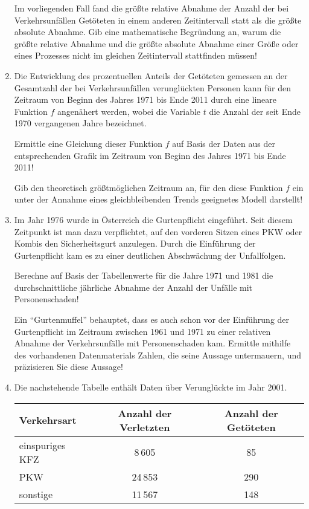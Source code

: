 \begin{langesbeispiel}
\begin{enumerate}
	Im vorliegenden Fall fand die größte relative Abnahme der Anzahl der bei Verkehrsunfällen Getöteten in einem anderen Zeitintervall statt als die größte absolute Abnahme. Gib eine mathematische Begründung an, warum die größte relative Abnahme und die größte absolute Abnahme einer Größe oder eines Prozesses nicht im gleichen Zeitintervall stattfinden müssen!

\item Die Entwicklung des prozentuellen Anteils der Getöteten gemessen an der Gesamtzahl der bei Verkehrsunfällen verunglückten Personen kann für den Zeitraum von Beginn des Jahres 1971 bis Ende 2011 durch eine lineare Funktion $f$ angenähert werden, wobei die Variable $t$ die Anzahl der seit Ende 1970 vergangenen Jahre bezeichnet. 

Ermittle eine Gleichung dieser Funktion $f$ auf Basis der Daten aus der entsprechenden Grafik im Zeitraum von Beginn des Jahres 1971 bis Ende 2011!

Gib den theoretisch größtmöglichen Zeitraum an, für den diese Funktion $f$ ein unter der Annahme eines gleichbleibenden Trends geeignetes Modell darstellt!

\item Im Jahr 1976 wurde in Österreich die Gurtenpflicht eingeführt. Seit diesem Zeitpunkt ist man dazu verpflichtet, auf den vorderen Sitzen eines PKW oder Kombis den Sicherheitsgurt anzulegen. Durch die Einführung der Gurtenpflicht kam es zu einer deutlichen Abschwächung der Unfallfolgen.

Berechne auf Basis der Tabellenwerte für die Jahre 1971 und 1981 die durchschnittliche jährliche Abnahme der Anzahl der Unfälle mit Personenschaden! 

Ein "`Gurtenmuffel"' behauptet, dass es auch schon vor der Einführung der Gurtenpflicht im Zeitraum zwischen 1961 und 1971 zu einer relativen Abnahme der Verkehrsunfälle mit  Personenschaden kam. Ermittle mithilfe des vorhandenen Datenmaterials Zahlen, die seine Aussage untermauern, und präzisieren Sie diese Aussage!

	\item Die nachstehende Tabelle enthält Daten über Verunglückte im Jahr 2001.
	
	\begin{center}
		\begin{tabular}{|l|c|c|}\hline
		Verkehrsart&Anzahl der Verletzten&Anzahl der Getöteten\\ \hline
		einspuriges KFZ&8\,605&85\\ \hline
		PKW&24\,853&290\\ \hline
		sonstige&11\,567&148\\ \hline
		\end{tabular}
	\end{center}
	

\end{enumerate}
\end{langesbeispiel}
